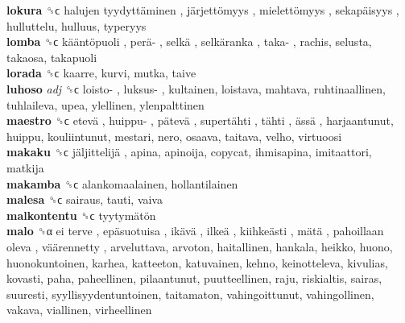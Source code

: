 \textbf{lokura} ␝ϲ   halujen tyydyttäminen ,  järjettömyys ,  mielettömyys ,  sekapäisyys , hulluttelu, hulluus, typeryys  \\
\textbf{lomba} ␝ϲ   kääntöpuoli ,  perä- ,  selkä ,  selkäranka ,  taka- , rachis, selusta, takaosa, takapuoli  \\
\textbf{lorada} ␝ϲ  kaarre, kurvi, mutka, taive  \\
\textbf{luhoso} \emph{adj}  ␝ϲ   loisto- ,  luksus- , kultainen, loistava, mahtava, ruhtinaallinen, tuhlaileva, upea, ylellinen, ylenpalttinen  \\
\textbf{maestro} ␝ϲ   etevä ,  huippu- ,  pätevä ,  supertähti ,  tähti ,  ässä , harjaantunut, huippu, kouliintunut, mestari, nero, osaava, taitava, velho, virtuoosi  \\
\textbf{makaku} ␝ϲ   jäljittelijä , apina, apinoija, copycat, ihmisapina, imitaattori, matkija  \\
\textbf{makamba} ␝ϲ  alankomaalainen, hollantilainen  \\
\textbf{malesa} ␝ϲ  sairaus, tauti, vaiva  \\
\textbf{malkontentu} ␝ϲ   tyytymätön   \\
\textbf{malo} ␝α   ei terve ,  epäsuotuisa ,  ikävä ,  ilkeä ,  kiihkeästi ,  mätä ,  pahoillaan oleva ,  väärennetty , arveluttava, arvoton, haitallinen, hankala, heikko, huono, huonokuntoinen, karhea, katteeton, katuvainen, kehno, keinotteleva, kivulias, kovasti, paha, paheellinen, pilaantunut, puutteellinen, raju, riskialtis, sairas, suuresti, syyllisyydentuntoinen, taitamaton, vahingoittunut, vahingollinen, vakava, viallinen, virheellinen  \\
